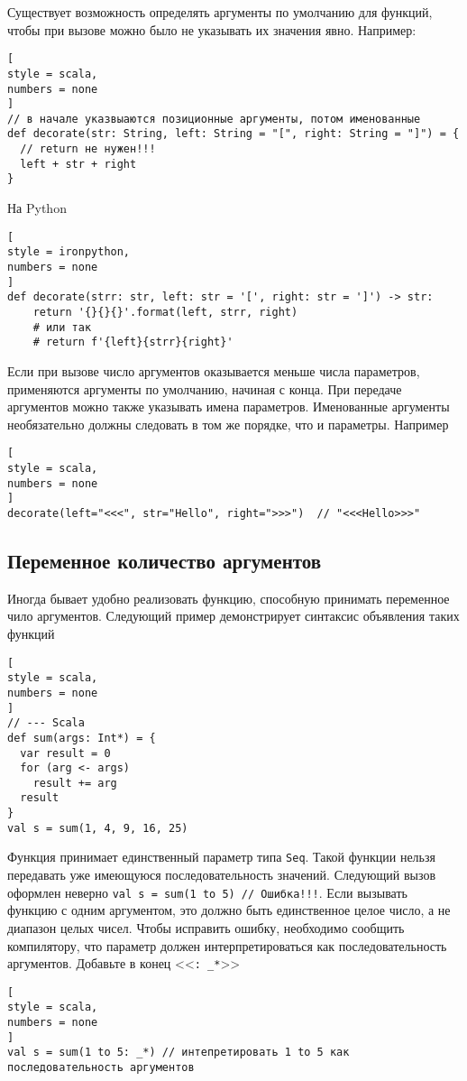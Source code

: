 \documentclass[%
	11pt,
	a4paper,
	utf8,
		]{article}
\begin{document}
Существует возможность определять аргументы по умолчанию для функций, чтобы при вызове можно было не указывать их значения явно. Например:
\begin{lstlisting}[
style = scala,
numbers = none
]
// в начале указвыаются позиционные аргументы, потом именованные
def decorate(str: String, left: String = "[", right: String = "]") = {
  // return не нужен!!!
  left + str + right
}
\end{lstlisting}

На Python
\begin{lstlisting}[
style = ironpython,
numbers = none
]
def decorate(strr: str, left: str = '[', right: str = ']') -> str:
    return '{}{}{}'.format(left, strr, right)
    # или так
    # return f'{left}{strr}{right}'
\end{lstlisting}

Если при вызове число аргументов оказывается меньше числа параметров, применяются аргументы по умолчанию, начиная с конца. При передаче аргументов можно также указывать имена параметров. Именованные аргументы необязательно должны следовать в том же порядке, что и параметры. Например
\begin{lstlisting}[
style = scala,
numbers = none
]
decorate(left="<<<", str="Hello", right=">>>")  // "<<<Hello>>>"
\end{lstlisting}

\subsection{Переменное количество аргументов}

Иногда бывает удобно реализовать функцию, способную принимать переменное чило аргументов. Следующий пример демонстрирует синтаксис объявления таких функций
\begin{lstlisting}[
style = scala,
numbers = none
]
// --- Scala
def sum(args: Int*) = {
  var result = 0
  for (arg <- args)
    result += arg
  result
}
val s = sum(1, 4, 9, 16, 25)
\end{lstlisting}

Функция принимает единственный параметр типа \texttt{Seq}. Такой функции нельзя передавать уже имеющуюся последовательность значений. Следующий вызов оформлен неверно \lstinline{val s = sum(1 to 5) // Ошибка!!!}. Если вызывать функцию с одним аргументом, это должно быть единственное целое число, а не диапазон целых чисел. Чтобы исправить ошибку, необходимо сообщить компилятору, что параметр должен интерпретироваться как последовательность аргументов. Добавьте в конец <<\texttt{: \_*}>>
\begin{lstlisting}[
style = scala,
numbers = none
]
val s = sum(1 to 5: _*) // интепретировать 1 to 5 как последовательность аргументов
\end{lstlisting}
\end{document}

